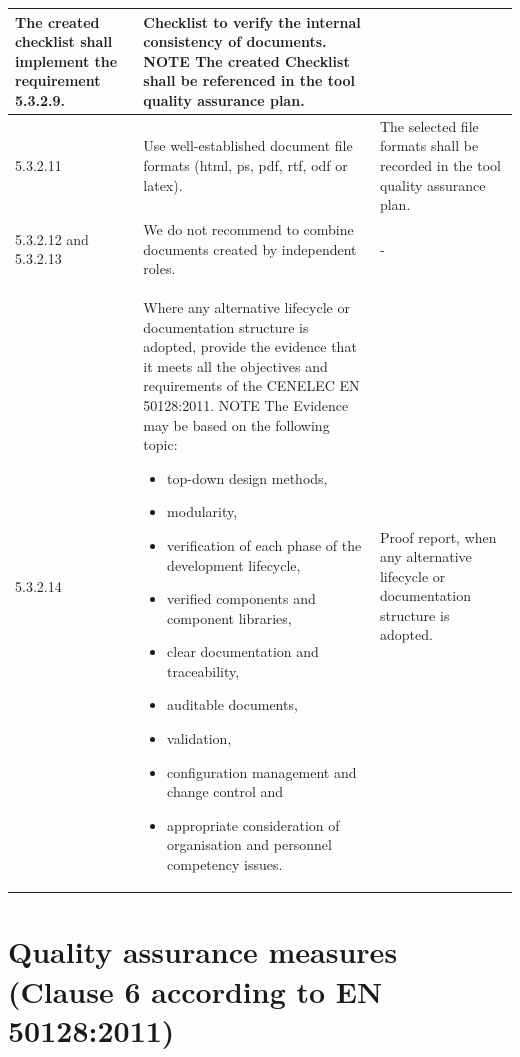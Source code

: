 \documentclass{template/openetcs_report}
\begin{document}
{\begin{longtable}{|p{2cm}|p{9cm}|p{3cm}|}
The created checklist shall implement the requirement 5.3.2.9.
& Checklist to verify the internal consistency of documents.
\linebreak
\linebreak
NOTE\linebreak
The created Checklist shall be referenced in the tool quality assurance plan.\\ 
\hline
5.3.2.11 & Use well-established document file formats (html, ps, pdf, rtf, odf or latex).
& The selected file formats shall be recorded in the tool quality assurance plan.\\ 
\hline
5.3.2.12 and 5.3.2.13 & We do not recommend to combine documents created by independent roles. 
& - \\ 
\hline
5.3.2.14 & Where any alternative lifecycle or documentation structure is adopted, provide the evidence that it meets all the objectives and requirements of the CENELEC EN 50128:2011.
\linebreak
\linebreak
NOTE\linebreak
The Evidence may be based on the following topic:
\begin{itemize}\itemsep=0pt
  \item top-down design methods,
  \item modularity,
  \item verification of each phase of the development lifecycle,
  \item verified components and component libraries,
  \item clear documentation and traceability,
  \item auditable documents,
  \item validation,
  \item configuration management and change control and
  \item appropriate consideration of organisation and personnel competency issues.
\end{itemize}
& Proof report, when any alternative lifecycle or documentation structure is adopted.\\ 
\hline
\end{longtable}}



\section{Quality assurance measures (Clause 6 according to EN 50128:2011)}
\label{clause6}
\end{document}
